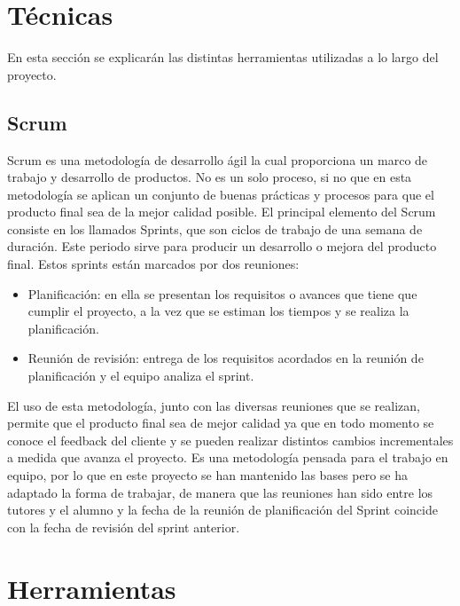 


\section{Técnicas}
En esta sección se explicarán las distintas herramientas utilizadas a lo largo del proyecto.

\subsection{Scrum}
Scrum es una metodología de desarrollo ágil la cual proporciona un marco de trabajo y desarrollo de productos. No es un solo proceso, si no que en esta metodología se aplican un conjunto de buenas prácticas y procesos para que el producto final sea de la mejor calidad posible.
El principal elemento del Scrum consiste en los llamados Sprints, que son ciclos de trabajo de una semana de duración. Este periodo sirve para producir un desarrollo o mejora del producto final. Estos sprints están marcados por dos reuniones:
\begin{itemize}
	\item Planificación: en ella se presentan los requisitos o avances que tiene que cumplir el proyecto, a la vez que se estiman los tiempos y se realiza la planificación.
	\item Reunión de revisión: entrega de los requisitos acordados en la reunión de planificación y el equipo analiza el sprint.
\end{itemize}
El uso de esta metodología, junto con las diversas reuniones que se realizan, permite que el producto final sea de mejor calidad ya que en todo momento se conoce el feedback del cliente y se pueden realizar distintos cambios incrementales a medida que avanza el proyecto.
Es una metodología pensada para el trabajo en equipo, por lo que en este proyecto se han mantenido las bases pero se ha adaptado la forma de trabajar, de manera que las reuniones han sido entre los tutores y el alumno y la fecha de la reunión de planificación del Sprint coincide con la fecha de revisión del sprint anterior.



\section{Herramientas}\label{herramientas}


